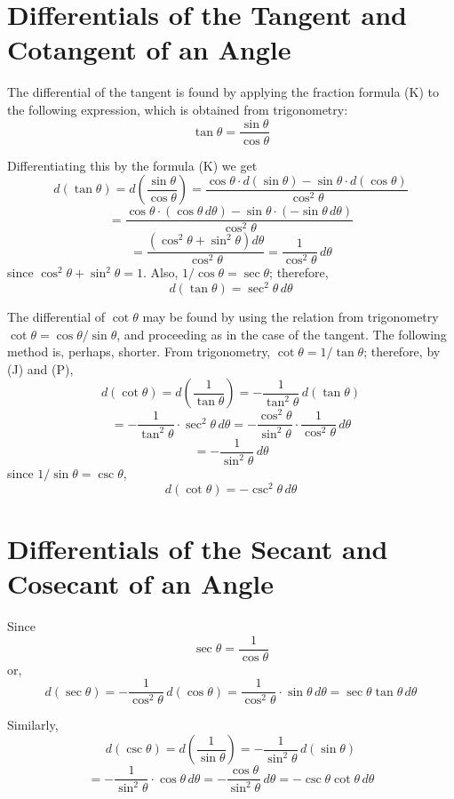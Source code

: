 \section{Differentials of the Tangent and Cotangent of an Angle}

The differential of the tangent is found by applying the fraction formula (K) to the following expression, which is obtained from trigonometry:
\[\tan \theta = \frac{\sin \theta}{\cos \theta}\]

Differentiating this by the formula (K) we get
\[d(\tan \theta) = d\left(\frac{\sin \theta}{\cos \theta}\right) = \frac{\cos \theta\cdot d(\sin \theta) - \sin \theta\cdot d(\cos \theta)}{\cos^2 \theta}\]
\[= \frac{\cos \theta\cdot(\cos \theta\,d\theta) - \sin \theta\cdot(-\sin \theta\,d\theta)}{\cos^2 \theta}\]
\[= \frac{(\cos^2 \theta + \sin^2 \theta)d\theta}{\cos^2 \theta} = \frac{1}{\cos^2 \theta}\,d\theta\]
since $\cos^2 \theta + \sin^2 \theta = 1$. Also, $1/\cos \theta = \sec \theta$; therefore,
\[d(\tan \theta) = \sec^2 \theta\,d\theta \tag{P}\label{eq:P}\]

The differential of $\cot \theta$ may be found by using the relation from trigonometry $\cot \theta = \cos \theta/\sin \theta$, and proceeding as in the case of the tangent. The following method is, perhaps, shorter. From trigonometry, $\cot \theta = 1/\tan \theta$; therefore, by (J) and (P),
\[d(\cot \theta) = d\left(\frac{1}{\tan \theta}\right) = -\frac{1}{\tan^2 \theta}\,d(\tan \theta)\]
\[= -\frac{1}{\tan^2 \theta}\cdot\sec^2 \theta\,d\theta = -\frac{\cos^2 \theta}{\sin^2 \theta}\cdot\frac{1}{\cos^2 \theta}\,d\theta\]
\[= -\frac{1}{\sin^2 \theta}\,d\theta\]
since $1/\sin \theta = \csc \theta$,
\[d(\cot \theta) = -\csc^2 \theta\,d\theta \tag{Q}\label{eq:Q}\]

\section{Differentials of the Secant and Cosecant of an Angle}

Since
\[\sec \theta = \frac{1}{\cos \theta}\]
or,
\[d(\sec \theta) = -\frac{1}{\cos^2 \theta}\,d(\cos \theta) = \frac{1}{\cos^2 \theta}\cdot\sin \theta\,d\theta = \sec \theta\tan \theta\,d\theta \tag{R}\label{eq:R}\]

Similarly,
\[d(\csc \theta) = d\left(\frac{1}{\sin \theta}\right) = -\frac{1}{\sin^2 \theta}\,d(\sin \theta)\]
\[= -\frac{1}{\sin^2 \theta}\cdot\cos \theta\,d\theta = -\frac{\cos \theta}{\sin^2 \theta}\,d\theta = -\csc \theta\cot \theta\,d\theta \tag{S}\label{eq:S}\]

